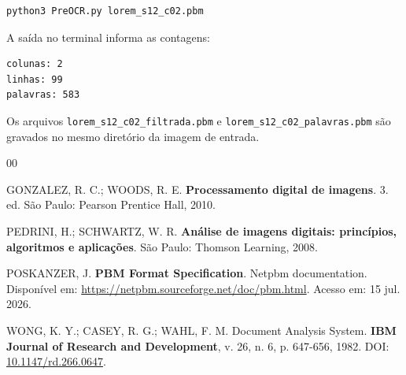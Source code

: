 \documentclass[12pt, a4paper]{article}
\begin{document}
\begin{verbatim}
python3 PreOCR.py lorem_s12_c02.pbm
\end{verbatim}

A saída no terminal informa as contagens:

\begin{verbatim}
colunas: 2
linhas: 99
palavras: 583
\end{verbatim}

Os arquivos \texttt{lorem\_s12\_c02\_filtrada.pbm} e \texttt{lorem\_s12\_c02\_palavras.pbm} são gravados no mesmo diretório da imagem de entrada.

\newpage
{}
{}
\renewcommand{\refname}{\centering REFERÊNCIAS}
\begin{thebibliography}{00}

GONZALEZ, R. C.; WOODS, R. E. \textbf{Processamento digital de imagens}. 3. ed. São Paulo: Pearson Prentice Hall, 2010.

PEDRINI, H.; SCHWARTZ, W. R. \textbf{Análise de imagens digitais: princípios, algoritmos e aplicações}. São Paulo: Thomson Learning, 2008.

POSKANZER, J. \textbf{PBM Format Specification}. Netpbm documentation. Disponível em: \url{https://netpbm.sourceforge.net/doc/pbm.html}. Acesso em: 15 jul. 2026.

WONG, K. Y.; CASEY, R. G.; WAHL, F. M. Document Analysis System. \textbf{IBM Journal of Research and Development}, v. 26, n. 6, p. 647-656, 1982. DOI: \href{https://doi.org/10.1147/rd.266.0647}{10.1147/rd.266.0647}.

\end{thebibliography}
\end{document}
